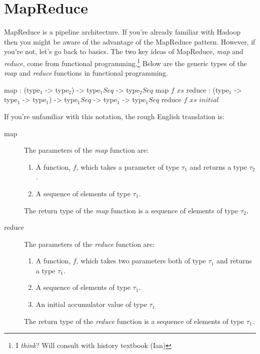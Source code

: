 \section{MapReduce}


MapReduce is a pipeline architecture.
If you're already familiar with Hadoop then you might be aware of the advantage of the MapReduce pattern.
However, if you're not, let's go back to basics.
The two key ideas of MapReduce, \textsl{map} and \textsl{reduce}, come from functional programming.\footnote{I \textsl{think}? Will consult with history textbook (Ian)}
Below are the generic types of the \textsl{map} and \textsl{reduce} functions in functional programming.

\begin{code}[language=lambda]{}
map : (type$_1$ -> type$_2$) -> type$_1 Seq$ -> type$_2 Seq$
map $f$ $xs$
reduce : (type$_1$ -> type$_1$ -> type$_1$) -> type$_1 Seq$ -> type$_1$ -> type$_1 Seq$
reduce $f$ $xs$ $initial$
\end{code}

If you're unfamiliar with this notation, the rough English translation is:
\begin{description}
    \item[map] The parameters of the \textsl{map} function are:
        \begin{enumerate}[label=(\alph*)]
            \item A function, $f$, which takes a parameter of type $\tau_1$ and returns a type $\tau_2$.
            \item A sequence of elements of type $\tau_1$.
        \end{enumerate}
        The return type of the \textsl{map} function is a sequence of elements of type $\tau_2$.
    \item[reduce] The parameters of the \textsl{reduce} function are:
        \begin{enumerate}[label=(\alph*)]
            \item A function, $f$, which takes two parameters both of type $\tau_1$ and returns a type $\tau_1$.
            \item A sequence of elements of type $\tau_1$.
            \item An initial accumulator value of type $\tau_1$
        \end{enumerate}
        The return type of the \textsl{reduce} function is a sequence of elements of type $\tau_1$.
\end{description}


